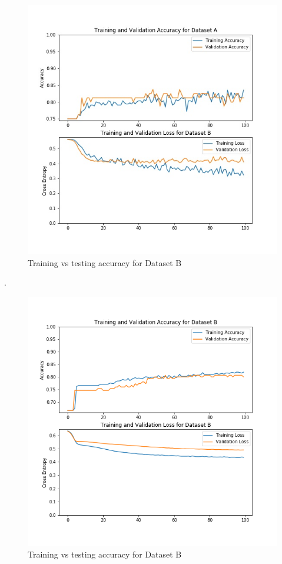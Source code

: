 \documentclass[10pt,twocolumn]{witseiepaper}
\begin{document}
\begin{figure}[h!]
    \centering
    \includegraphics[scale=0.4]{./ANN_A.jpg}
    \caption{Training vs testing accuracy for Dataset B}
    \label{fig:anna}
\end{figure}{}

\newpage
.
\vspace{8.45cm}

\begin{figure}[h!]
    \centering
    \includegraphics[scale=0.4]{./B_80_81_No_Dropout_Validation_split.png}
    \caption{Training vs testing accuracy for Dataset B}
    \label{fig:annb}
\end{figure}{}
\end{document}

